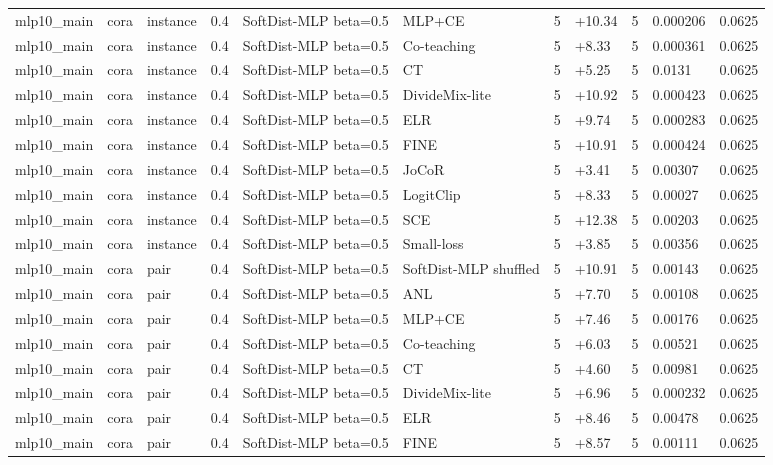 \begin{table}[t]
\begin{tabular}{llllllrlrll}
mlp10_main & cora & instance & 0.4 & SoftDist-MLP beta=0.5 & MLP+CE & 5 & +10.34 & 5 & 0.000206 & 0.0625 \\
mlp10_main & cora & instance & 0.4 & SoftDist-MLP beta=0.5 & Co-teaching & 5 & +8.33 & 5 & 0.000361 & 0.0625 \\
mlp10_main & cora & instance & 0.4 & SoftDist-MLP beta=0.5 & CT & 5 & +5.25 & 5 & 0.0131 & 0.0625 \\
mlp10_main & cora & instance & 0.4 & SoftDist-MLP beta=0.5 & DivideMix-lite & 5 & +10.92 & 5 & 0.000423 & 0.0625 \\
mlp10_main & cora & instance & 0.4 & SoftDist-MLP beta=0.5 & ELR & 5 & +9.74 & 5 & 0.000283 & 0.0625 \\
mlp10_main & cora & instance & 0.4 & SoftDist-MLP beta=0.5 & FINE & 5 & +10.91 & 5 & 0.000424 & 0.0625 \\
mlp10_main & cora & instance & 0.4 & SoftDist-MLP beta=0.5 & JoCoR & 5 & +3.41 & 5 & 0.00307 & 0.0625 \\
mlp10_main & cora & instance & 0.4 & SoftDist-MLP beta=0.5 & LogitClip & 5 & +8.33 & 5 & 0.00027 & 0.0625 \\
mlp10_main & cora & instance & 0.4 & SoftDist-MLP beta=0.5 & SCE & 5 & +12.38 & 5 & 0.00203 & 0.0625 \\
mlp10_main & cora & instance & 0.4 & SoftDist-MLP beta=0.5 & Small-loss & 5 & +3.85 & 5 & 0.00356 & 0.0625 \\
mlp10_main & cora & pair & 0.4 & SoftDist-MLP beta=0.5 & SoftDist-MLP shuffled & 5 & +10.91 & 5 & 0.00143 & 0.0625 \\
mlp10_main & cora & pair & 0.4 & SoftDist-MLP beta=0.5 & ANL & 5 & +7.70 & 5 & 0.00108 & 0.0625 \\
mlp10_main & cora & pair & 0.4 & SoftDist-MLP beta=0.5 & MLP+CE & 5 & +7.46 & 5 & 0.00176 & 0.0625 \\
mlp10_main & cora & pair & 0.4 & SoftDist-MLP beta=0.5 & Co-teaching & 5 & +6.03 & 5 & 0.00521 & 0.0625 \\
mlp10_main & cora & pair & 0.4 & SoftDist-MLP beta=0.5 & CT & 5 & +4.60 & 5 & 0.00981 & 0.0625 \\
mlp10_main & cora & pair & 0.4 & SoftDist-MLP beta=0.5 & DivideMix-lite & 5 & +6.96 & 5 & 0.000232 & 0.0625 \\
mlp10_main & cora & pair & 0.4 & SoftDist-MLP beta=0.5 & ELR & 5 & +8.46 & 5 & 0.00478 & 0.0625 \\
mlp10_main & cora & pair & 0.4 & SoftDist-MLP beta=0.5 & FINE & 5 & +8.57 & 5 & 0.00111 & 0.0625 \\

\end{tabular}
\end{table}
